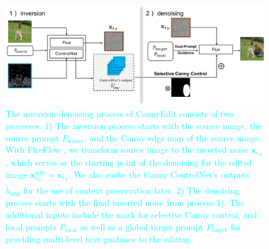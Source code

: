 \documentclass{article}
\begin{document}
\begin{figure}[t]
    \centering
    \includegraphics[width=0.97\linewidth]{figures/framework3.pdf}
    \vspace{-1mm}
    \caption{\textcolor{cyan}{The inversion-denoising process of CannyEdit consists of two processes. 1) The inversion process starts with the source image, the source prompt $P_\text{source}$, and the Canny edge map of the source image. With FireFlow \citep{deng2024fireflow}, we transform source image to the inverted noise $\mathbf{x}_{t_N}$, which serves as the starting point of the denoising for the edited image $\mathbf{x}^\text{edit}_{t_N}=\mathbf{x}_{t_N}$. We also cache the  Canny ControlNet's outputs $\tilde{h}^{\prime}_{\text{img}}$ for the use of context preservation later. 2) The denoising process starts with the final inverted noise from process 1). The additional inputs include the mask for selective Canny control, and local prompts $P_\text{local}$ as well as a global target prompt $P_\text{target}$ for providing multi-level text guidance to the editing.}}     %
    \label{fig:framework}
\end{figure}


\end{document}
